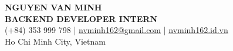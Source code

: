 \begin{center}
    {\fontsize{25}{28}\selectfont\bfseries NGUYEN VAN MINH}\\[4pt]
    {\large\bfseries BACKEND DEVELOPER INTERN}\\[6pt]
    (+84) 353 999 798 \;|\; \href{mailto:nvminh162@gmail.com}{nvminh162@gmail.com} \;|\; \href{https://nvminh162.id.vn}{nvminh162.id.vn}\\[3pt]
    Ho Chi Minh City, Vietnam
    \\ \vspace{-1pt}
\end{center}
